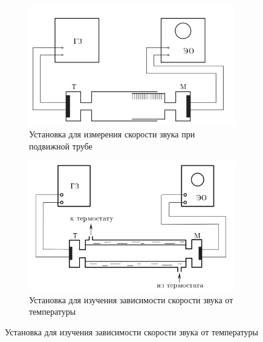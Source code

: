 \begin{figure}
    \centering
    \begin{subfigure}{0.45\linewidth}
        \includegraphics[width=9cm]{setup1.png}
        \caption{Установка для измерения скорости звука при подвижной трубе}
    \end{subfigure}
\hfill
    \begin{subfigure}{0.45\linewidth}
        \includegraphics[width=9cm]{setup2.png}
        \caption{Установка для изучения зависимости скорости звука от температуры}
    \end{subfigure}
\end{figure}




